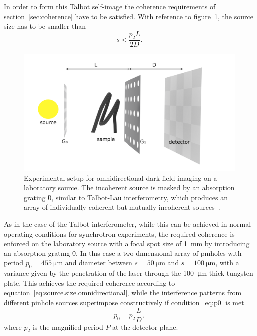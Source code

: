 In order to form this Talbot self-image the coherence requirements of
section~\ref{sec:coherence} have to be satisfied. With reference to
figure~\ref{fig:omnidirectional-lab}, the source size has to be
smaller than
\begin{equation}
    s < \frac{p_2L}{2D}.
    \label{eq:source.size.omnidirectional}
\end{equation}

\begin{figure}[htb]
    \centering
    \includegraphics[width=\textwidth]{gfx/omnidirectional/schematic-with-arrows.png}
    \caption{Experimental setup for omnidirectional dark-field imaging on a
    laboratory source. The incoherent source is masked by an absorption
grating \G0, similar to Talbot-Lau interferometry, which produces an array
of individually coherent but mutually incoherent
sources~\parencite{kagias2018omnidir}.}
    \label{fig:omnidirectional-lab}
\end{figure}

As in the case of the Talbot interferometer, while this can be achieved in
normal operating conditions for synchrotron experiments, the required
coherence is enforced on the laboratory source with a focal spot size of
\SI{1}{\milli\meter} by introducing an absorption grating \G0. In this case
a two-dimensional array of pinholes with period $p_0 =
\SI{455}{\micro\meter}$ and diameter between $s = \SI{50}{\micro\meter}$ and
$ s = \SI{100}{\micro\meter}$, with a variance given by the penetration of
the laser through the \SI{100}{\micro\meter} thick tungsten
plate. This achieves the required coherence according to
equation~\eqref{eq:source.size.omnidirectional}, while the interference
patterns from different pinhole sources superimpose constructively if
condition~\eqref{eq:p0} is met
\begin{equation}
    p_0 = p_2 \frac{L}{D}\label{eq:p0.omnidirectional},
\end{equation}
where $p_2$ is the magnified period $P$ at the detector plane.


